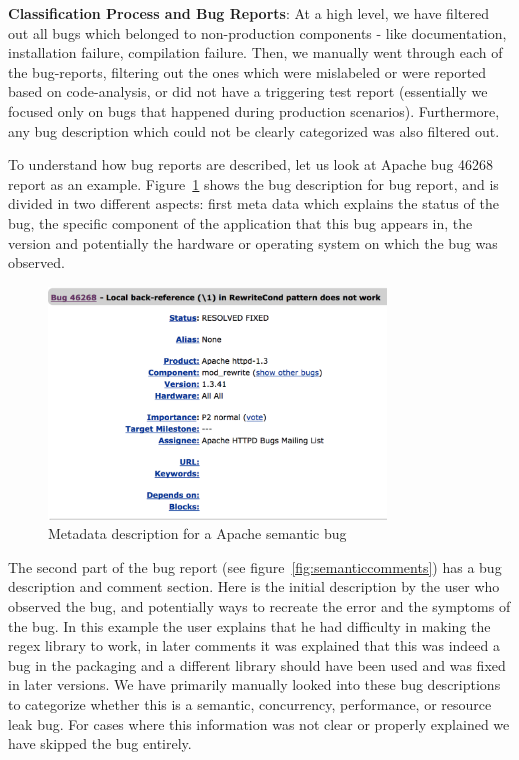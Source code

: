 \textbf{Classification Process and Bug Reports}:
At a high level, we have filtered out all bugs which belonged to non-production components - like documentation, installation failure, compilation failure.
Then, we manually went through each of the bug-reports, filtering out the ones which were mislabeled or were reported based on code-analysis, or did not have a triggering test report (essentially we focused only on bugs that happened during production scenarios). 
Furthermore, any bug description which could not be clearly categorized was also filtered out.

To understand how bug reports are described, let us look at Apache bug 46268 report as an example.
Figure~\ref{fig:semanticbugdesc} shows the bug description for bug report, and is divided in two different aspects: first meta data which explains the status of the bug, the specific component of the application that this bug appears in, the version and potentially the hardware or operating system on which the bug was observed.

\begin{figure}[!h]
\begin{center}
\includegraphics[width=0.8\textwidth]{parikshan/figs/bug-description}
\caption{Metadata description for a Apache semantic bug}	
\label{fig:semanticbugdesc}
\end{center}
\end{figure}

The second part of the bug report (see figure~\ref{fig:semanticcomments}) has a bug description and comment section. Here is the initial description by the user who observed the bug, and potentially ways to recreate the error and the symptoms of the bug. In this example the user explains that he had difficulty in making the regex library to work, in later comments it was explained that this was indeed a bug in the packaging and a different library should have been used and was fixed in later versions. We have primarily manually looked into these bug descriptions to categorize whether this is a semantic, concurrency, performance, or resource leak bug. For cases where this information was not clear or properly explained we have skipped the bug entirely. 

